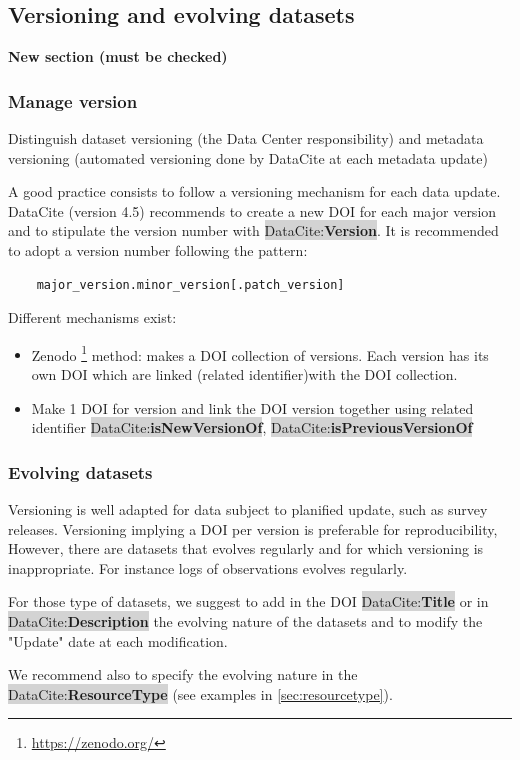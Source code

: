 \documentclass[11pt,a4paper]{ivoa}
\newcommand{\dataciteterm}[1]{\colorbox{lightgray}{DataCite:\textbf{#1}}}
\begin{document}
\subsection{Versioning and evolving datasets}
\label{sec:version}
\textbf{\color{red}New section (must be checked)}

\subsubsection{Manage version}
Distinguish dataset versioning (the Data Center responsibility) and metadata versioning (automated versioning done by DataCite at each metadata update)

A good practice consists to follow a versioning mechanism for each data update. DataCite (version 4.5) recommends to create a new DOI for each major version and to stipulate the version number with \dataciteterm{Version}. 
It is recommended to adopt a version number following the pattern:
\begin{verbatim}
	major_version.minor_version[.patch_version]
\end{verbatim}


Different mechanisms exist:
\begin{itemize}
\item  Zenodo \footnote{\url{https://zenodo.org/}} method: makes a DOI collection of versions. Each version has its own DOI which are linked (related identifier)with the DOI collection.
\item Make 1 DOI for version and link the DOI version together using related identifier \dataciteterm{isNewVersionOf}, \dataciteterm{isPreviousVersionOf}
\end{itemize}

\subsubsection{Evolving datasets}
\label{sec:evolving}
Versioning is well adapted for data subject to planified update, such as survey releases. Versioning implying a DOI per version is preferable for reproducibility, 
However, there are datasets that evolves regularly and for which versioning is inappropriate. For instance logs of observations evolves regularly.


For those type of datasets, we suggest to add in the DOI \dataciteterm{Title} or in \dataciteterm{Description} the evolving nature of the datasets and to modify the "Update" date at each modification.

We recommend also to specify the evolving nature in the \dataciteterm{ResourceType} (see examples in \ref{sec:resourcetype}).\\
\end{document}
